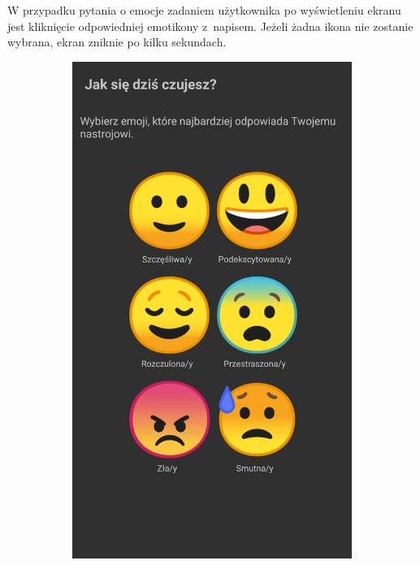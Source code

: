 W przypadku pytania o emocje zadaniem użytkownika po wyświetleniu ekranu jest kliknięcie odpowiedniej emotikony z~napisem. Jeżeli żadna ikona nie zostanie wybrana, ekran zniknie po kilku sekundach.

\begin{figure}[H]
	\centering
	\begin{subfigure}{0.35\textwidth}
		\centering
		\includegraphics[scale=0.13]{rozdzial3/screen-emoji.png}
		\subcaption{\label{subfigure_a}}
	\end{subfigure}

\end{figure}
